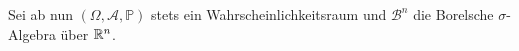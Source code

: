 Sei ab nun $ (\Omega,\mathcal{A},\mathbb{P}) $ stets ein Wahrscheinlichkeitsraum und $ \mathcal{B}^n $ die Borelsche $ \sigma $-Algebra über $ \mathbb{R}^n $.

